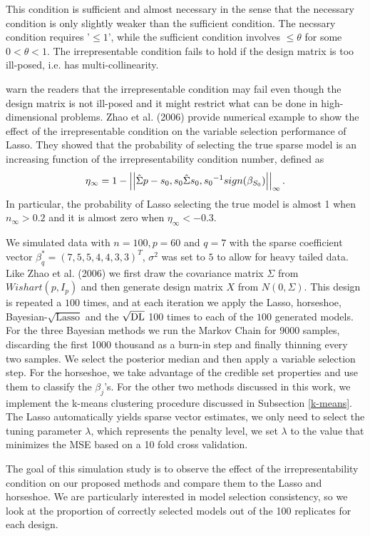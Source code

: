 \documentclass[ba]{imsart}
\begin{document}
This condition is sufficient and almost necessary in the sense that the necessary condition is only slightly weaker than the sufficient condition. The necssary condition requires '$\leq 1$', while the sufficient condition involves $\leq \theta$ for some $0 < \theta < 1$. The irrepresentable condition fails to hold if the design matrix is too ill-posed, i.e. has multi-collinearity.

\citep{buhlmann2011statistics} warn the readers that the irrepresentable condition may fail even though the design matrix is not ill-posed and it might restrict what can be done in high-dimensional problems. Zhao et al. (2006) provide numerical example to show the effect of the irrepresentable condition on the variable selection performance of Lasso. They showed that the probability of selecting the true sparse model is an increasing function of the irrepresentability condition number, defined as $$ \eta_{\infty} = 1 - \left|\left| \hat{\Sigma}{p-s_0,s_0} \hat{\Sigma}{s_0,s_0}^{-1} sign(\beta_{S_0}) \right|\right|_{\infty} . $$ In particular, the probability of Lasso selecting the true model is almost 1 when $n_{\infty} > 0.2$ and it is almost zero when $\eta_{\infty} < -0.3$.

We simulated data with $n = 100, p = 60$ and $q = 7$ with the sparse coefficient vector $\beta_{q}^* = (7,5,5,4,4,3,3)^T$, $\sigma^2$ was set to $5$ to allow for heavy tailed data. Like Zhao et al. (2006) we first draw the covariance matrix $\Sigma$ from $Wishart(p, I_p)$ and then generate design matrix $X$ from $N(0,\Sigma)$. This design is repeated a $100$ times, and at each iteration we apply the Lasso, horseshoe, Bayesian-$\sqrt{\text{Lasso}}$ and the $\sqrt{\text{\rm{DL}}}$ 100 times to each of the $100$ generated models. For the three Bayesian methods we run the Markov Chain for 9000 samples, discarding the first 1000 thousand as a burn-in step and finally thinning every two samples. We select the posterior median and then apply a variable selection step. For the horseshoe, we take advantage of the credible set properties and use them to classify the $\beta_j$'s. For the other two methods discussed in this work, we implement the k-means clustering procedure discussed in Subsection \ref{k-means}. The Lasso automatically yields sparse vector estimates, we only need to select the tuning parameter $\lambda$, which represents the penalty level, we set $\lambda$ to the value that minimizes the MSE based on a 10 fold cross validation.

The goal of this simulation study is to observe the effect of the irrepresentability condition on our proposed methods and compare them to the Lasso and horseshoe. We are particularly interested in model selection consistency, so we look at the proportion of correctly selected models out of the 100 replicates for each design.
\end{document}
